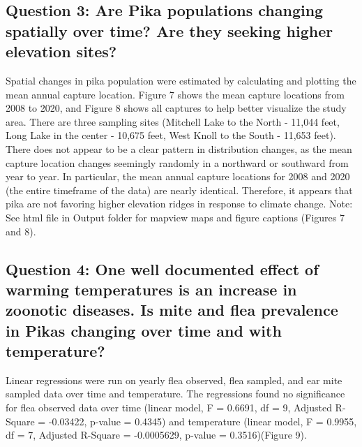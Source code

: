 \documentclass[
  12pt,
]{article}
\begin{document}
\hypertarget{question-3-are-pika-populations-changing-spatially-over-time-are-they-seeking-higher-elevation-sites}{%
\subsection{Question 3: Are Pika populations changing spatially over
time? Are they seeking higher elevation
sites?}\label{question-3-are-pika-populations-changing-spatially-over-time-are-they-seeking-higher-elevation-sites}}

Spatial changes in pika population were estimated by calculating and
plotting the mean annual capture location. Figure 7 shows the mean
capture locations from 2008 to 2020, and Figure 8 shows all captures to
help better visualize the study area. There are three sampling sites
(Mitchell Lake to the North - 11,044 feet, Long Lake in the center -
10,675 feet, West Knoll to the South - 11,653 feet). There does not
appear to be a clear pattern in distribution changes, as the mean
capture location changes seemingly randomly in a northward or southward
from year to year. In particular, the mean annual capture locations for
2008 and 2020 (the entire timeframe of the data) are nearly identical.
Therefore, it appears that pika are not favoring higher elevation ridges
in response to climate change. Note: See html file in Output folder for
mapview maps and figure captions (Figures 7 and 8).

\hypertarget{question-4-one-well-documented-effect-of-warming-temperatures-is-an-increase-in-zoonotic-diseases.-is-mite-and-flea-prevalence-in-pikas-changing-over-time-and-with-temperature}{%
\subsection{Question 4: One well documented effect of warming
temperatures is an increase in zoonotic diseases. Is mite and flea
prevalence in Pikas changing over time and with
temperature?}\label{question-4-one-well-documented-effect-of-warming-temperatures-is-an-increase-in-zoonotic-diseases.-is-mite-and-flea-prevalence-in-pikas-changing-over-time-and-with-temperature}}

Linear regressions were run on yearly flea observed, flea sampled, and
ear mite sampled data over time and temperature. The regressions found
no significance for flea observed data over time (linear model, F =
0.6691, df = 9, Adjusted R-Square = -0.03422, p-value = 0.4345) and
temperature (linear model, F = 0.9955, df = 7, Adjusted R-Square =
-0.0005629, p-value = 0.3516)(Figure 9).
\end{document}
